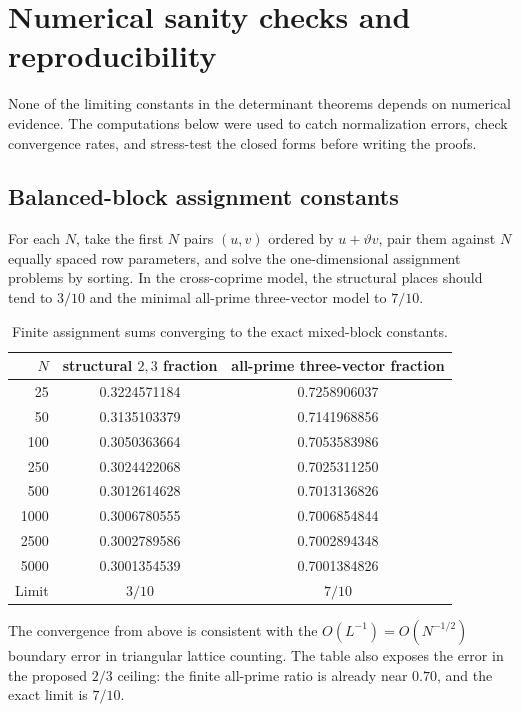 \documentclass[11pt,oneside]{article}
\theoremstyle{definition}
\theoremstyle{remark}
\begin{document}
\section{Numerical sanity checks and reproducibility}
\label{sec:numerics}

None of the limiting constants in the determinant theorems depends on numerical evidence.
The computations below were used to catch normalization errors, check convergence rates, and
stress-test the closed forms before writing the proofs.

\subsection{Balanced-block assignment constants}

For each $N$, take the first $N$ pairs $(u,v)$ ordered by $u+\vartheta v$, pair them against
$N$ equally spaced row parameters, and solve the one-dimensional assignment problems by
sorting.  In the cross-coprime model, the structural places should tend to $3/10$ and the
minimal all-prime three-vector model to $7/10$.

\begin{table}[htbp]
\centering
\small
\begin{tabular}{@{}rcc@{}}
\toprule
$N$ & structural $2,3$ fraction & all-prime three-vector fraction \\
\midrule
25   & 0.3224571184 & 0.7258906037 \\
50   & 0.3135103379 & 0.7141968856 \\
100  & 0.3050363664 & 0.7053583986 \\
250  & 0.3024422068 & 0.7025311250 \\
500  & 0.3012614628 & 0.7013136826 \\
1000 & 0.3006780555 & 0.7006854844 \\
2500 & 0.3002789586 & 0.7002894348 \\
5000 & 0.3001354539 & 0.7001384826 \\
\midrule
Limit & $3/10$ & $7/10$ \\
\bottomrule
\end{tabular}
\caption{Finite assignment sums converging to the exact mixed-block constants.}
\label{tab:mixed-numerics}
\end{table}

The convergence from above is consistent with the $O(L^{-1})=O(N^{-1/2})$ boundary error in
triangular lattice counting.  The table also exposes the error in the proposed $2/3$ ceiling:
the finite all-prime ratio is already near $0.70$, and the exact limit is $7/10$.
\end{document}
